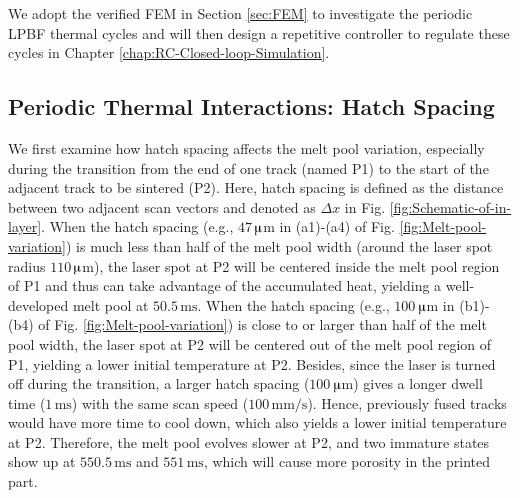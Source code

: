 \documentclass [11pt, proquest] {uwthesis}[2020/02/24]
\begin{document}
We adopt the verified FEM in Section \ref{sec:FEM} to investigate the periodic
LPBF thermal cycles and will then design a repetitive controller to regulate these cycles in Chapter \ref{chap:RC-Closed-loop-Simulation}.

\subsection{Periodic Thermal Interactions: Hatch Spacing} \label{subsec:Hatch-Spacing}

We first examine how hatch spacing affects the melt pool variation,
especially during the transition from the end of one track (named
P1) to the start of the adjacent track to be sintered (P2). Here,
hatch spacing is defined as the distance between two adjacent scan
vectors and denoted as $\Delta x$ in Fig. \ref{fig:Schematic-of-in-layer}.
When the hatch spacing (e.g., $47\,$$\muup$m in (a1)-(a4) of Fig.
\ref{fig:Melt-pool-variation}) is much less than half of the melt
pool width (around the laser spot radius $110\,$$\muup$m), the laser
spot at P2 will be centered inside the melt pool region of P1 and
thus can take advantage of the accumulated heat, yielding a well-developed
melt pool at $50.5\,\text{ms}$. When the hatch spacing (e.g., $100\,$$\muup$m
in (b1)-(b4) of Fig. \ref{fig:Melt-pool-variation}) is close to or
larger than half of the melt pool width, the laser spot at P2 will
be centered out of the melt pool region of P1, yielding a lower initial
temperature at P2. Besides, since the laser is turned off during the
transition, a larger hatch spacing ($100\,$$\muup$m) gives a longer
dwell time ($1\,\text{ms}$) with the same scan speed ($100\,\text{mm/s}$).
Hence, previously fused tracks would have more time to cool down,
which also yields a lower initial temperature at P2. Therefore, the
melt pool evolves slower at P2, and two immature states show up at
$550.5\,\text{ms}$ and $551\,\text{ms}$, which will cause more porosity
in the printed part. 
\end{document}
